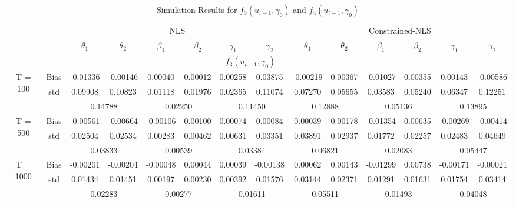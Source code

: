 \documentclass[a4paper,12pt,times,numbered,print,index]{report}
\numberwithin{equation}{section}
\begin{document}
	\begin{table}[htbp]
		\centering
		\caption{Simulation Results for $f_3 (u_{t-1}, \gamma_0)$ and $f_4 (u_{t-1}, \gamma_0)$}
		\begin{adjustbox}{max width=\textwidth}
			\begin{tabular}{cccccccccccccc}
				\toprule
				&       & \multicolumn{6}{c}{NLS}                       & \multicolumn{6}{c}{Constrained-NLS} \\
				&       & $\theta_1$ & $\theta_2$ & $\beta_1$ & $\beta_2$ & $\gamma_1$ & $\gamma_2$ & $\theta_1$ & $\theta_2$ & $\beta_1$ & $\beta_2$ & $\gamma_1$ & $\gamma_2$ \\
				\midrule
				&       & \multicolumn{10}{c}{$f_3 (u_{t-1}, \gamma_0)$}                \\
				\midrule
				\multirow{3}[1]{*}{T = 100} & Bias  & -0.01336 & -0.00146 & 0.00040 & 0.00012 & 0.00258 & 0.03875 & -0.00219 & 0.00367 & -0.01027 & 0.00355 & 0.00143 & -0.00586 \\
				& std   & 0.09908 & 0.10823 & 0.01118 & 0.01976 & 0.02365 & 0.11074 & 0.07270 & 0.05655 & 0.03583 & 0.05240 & 0.06347 & 0.12251 \\
				&       & \multicolumn{2}{c}{0.14788} & \multicolumn{2}{c}{0.02250} & \multicolumn{2}{c}{0.11450} & \multicolumn{2}{c}{0.12888} & \multicolumn{2}{c}{0.05136} & \multicolumn{2}{c}{0.13895} \\
				\multirow{3}[0]{*}{T = 500} & Bias  & -0.00561 & -0.00664 & -0.00106 & 0.00100 & 0.00074 & 0.00084 & 0.00039 & 0.00178 & -0.01354 & 0.00635 & -0.00269 & -0.00414 \\
				& std   & 0.02504 & 0.02534 & 0.00283 & 0.00462 & 0.00631 & 0.03351 & 0.03891 & 0.02937 & 0.01772 & 0.02257 & 0.02483 & 0.04649 \\
				&       & \multicolumn{2}{c}{0.03833} & \multicolumn{2}{c}{0.00539} & \multicolumn{2}{c}{0.03384} & \multicolumn{2}{c}{0.06821} & \multicolumn{2}{c}{0.02083} & \multicolumn{2}{c}{0.05447} \\
				\multirow{3}[1]{*}{T = 1000} & Bias  & -0.00201 & -0.00204 & -0.00048 & 0.00044 & 0.00039 & -0.00138 & 0.00062 & 0.00143 & -0.01299 & 0.00738 & -0.00171 & -0.00021 \\
				& std   & 0.01434 & 0.01451 & 0.00197 & 0.00230 & 0.00392 & 0.01576 & 0.03144 & 0.02371 & 0.01291 & 0.01631 & 0.01754 & 0.03414 \\
				&       & \multicolumn{2}{c}{0.02283} & \multicolumn{2}{c}{0.00277} & \multicolumn{2}{c}{0.01611} & \multicolumn{2}{c}{0.05511} & \multicolumn{2}{c}{0.01493} & \multicolumn{2}{c}{0.04048} \\

\end{tabular}
\end{adjustbox}
\end{table}
\end{document}
